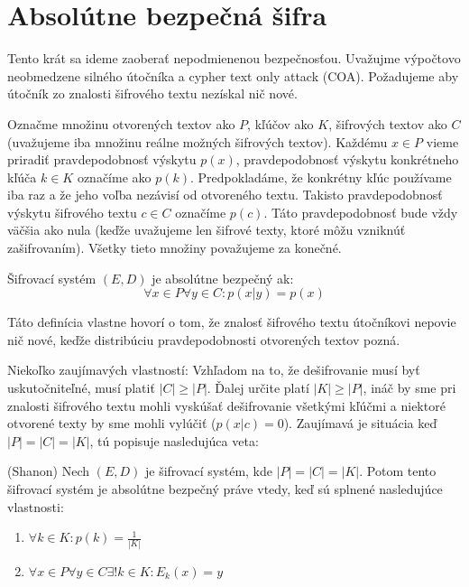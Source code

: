 \section{Absolútne bezpečná šifra}

Tento krát sa ideme zaoberať nepodmienenou bezpečnosťou. Uvažujme 
výpočtovo neobmedzene silného útočníka a cypher text only attack (COA).
Požadujeme aby útočník zo znalosti šifrového textu nezískal nič nové.

Označme množinu otvorených textov ako $P$, kľúčov ako $K$, šifrových textov ako $C$
(uvažujeme iba množinu reálne možných šifrových textov). Každému $x \in P$ vieme priradiť
pravdepodobnosť výskytu $p(x)$, pravdepodobnosť
výskytu konkrétneho kľúča $k \in K$ označíme ako $p(k)$. Predpokladáme, že
konkrétny kľúc používame iba raz a že jeho voľba nezávisí od otvoreného textu.
Takisto pravdepodobnosť výskytu šifrového textu $c \in C$ označíme $p(c)$. Táto pravdepodobnosť
bude vždy väčšia ako nula (keďže uvažujeme len šifrové texty, ktoré môžu vzniknúť zašifrovaním).
Všetky tieto množiny považujeme za konečné.

\begin{definicia}
Šifrovací systém $(E,D)$ je absolútne bezpečný ak:
$$\forall x \in P \forall y \in C\colon p(x | y) = p(x)$$
\end{definicia}
\begin{komentar}
Táto definícia vlastne hovorí o tom, že znalosť šifrového textu útočníkovi nepovie nič
nové, keďže distribúciu pravdepodobnosti otvorených textov pozná.
\end{komentar}

Niekoľko zaujímavých vlastností:
Vzhľadom na to, že dešifrovanie musí byť uskutočniteľné, musí platiť $|C| \geq |P|$.
Ďalej určite platí $|K| \geq |P|$, ináč by sme pri znalosti šifrového textu mohli 
vyskúšať dešifrovanie všetkými kľúčmi a niektoré otvorené texty by sme mohli vylúčiť
($p(x|c) = 0$). Zaujímavá je situácia keď $|P| = |C| = |K|$, tú popisuje nasledujúca veta:

\begin{veta}{(Shanon)}
Nech $(E,D)$ je šifrovací systém, kde $|P|=|C|=|K|$. Potom tento šifrovací systém je
absolútne bezpečný práve vtedy, keď sú splnené nasledujúce vlastnosti:
\begin{enumerate}
\item $\forall k \in K\colon p(k) = \frac{1}{|K|}$
\item $\forall x \in P \forall y \in C \exists! k \in K\colon E_k(x) = y$
\end{enumerate}
\end{veta}

